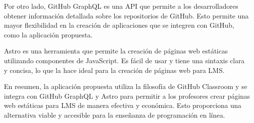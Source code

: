 Por otro lado, GitHub GraphQL es una API que permite a los desarrolladores obtener información detallada sobre los repositorios de GitHub. Esto permite una mayor flexibilidad en la creación de aplicaciones que se integren con GitHub, como la aplicación propuesta.

Astro es una herramienta que permite la creación de páginas web estáticas utilizando componentes de JavaScript. Es fácil de usar y tiene una sintaxis clara y concisa, lo que la hace ideal para la creación de páginas web para LMS.

En resumen, la aplicación propuesta utiliza la filosofía de GitHub Classroom y se integra con GitHub GraphQL y Astro para permitir a los profesores crear páginas web estáticas para LMS de manera efectiva y económica. Esto proporciona una alternativa viable y accesible para la enseñanza de programación en línea.

